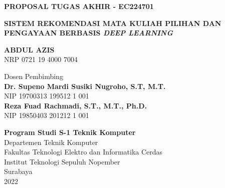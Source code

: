 {

\textbf{\large PROPOSAL TUGAS AKHIR - EC224701}

\vspace{2cm}

\begin{Large}
    \uppercase{\textbf{Sistem rekomendasi Mata Kuliah Pilihan dan Pengayaan berbasis \emph{Deep Learning}}}
\end{Large}

\vspace{2cm}

\begin{large}
    \uppercase{\textbf{Abdul Azis}} \\
    NRP 0721 19 4000 7004

    \vspace{2cm}

    Dosen Pembimbing \\
    \textbf{Dr. Supeno Mardi Susiki Nugroho, S.T, M.T.} \\
    NIP 19700313 199512 1 001 \\

    \textbf{Reza Fuad Rachmadi, S.T., M.T., Ph.D.} \\
    NIP 19850403 201212 1 001 \\
\end{large}

\vspace{2cm}

\textbf{Program Studi S-1 Teknik Komputer} \\
Departemen Teknik Komputer \\
Fakultas Teknologi Elektro dan Informatika Cerdas \\
Institut Teknologi Sepuluh Nopember \\

Surabaya \\
2022 \\
}
